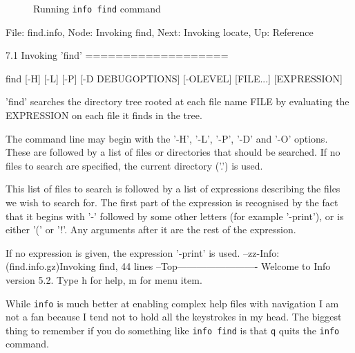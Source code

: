 \documentclass[10pt,american,]{book}
\newenvironment{Shaded}{\begin{snugshade}}{\end{snugshade}}
\newcommand{\KeywordTok}[1]{\textcolor[rgb]{0.13,0.29,0.53}{\textbf{{#1}}}}
\newcommand{\StringTok}[1]{\textcolor[rgb]{0.31,0.60,0.02}{{#1}}}
\newcommand{\NormalTok}[1]{{#1}}
\numberwithin{figure}{chapter}
\DeclareRobustCommand{\drcap}[1]{\begin{figure}[H]\caption{#1}\end{figure}}
\renewcommand{\KeywordTok}[1]{{#1}}
\renewcommand{\StringTok}[1]{{#1}}
\renewcommand{\NormalTok}[1]{{#1}}
\begin{document}
\drcap{Running \texttt{info find} command}

\begin{Shaded}
\begin{Highlighting}[]
\KeywordTok{File}\NormalTok{: find.info,  Node: Invoking find,  Next: Invoking locate,  Up: Reference}

\KeywordTok{7.1} \NormalTok{Invoking }\StringTok{'find'}
\NormalTok{===================}

     \KeywordTok{find} \NormalTok{[-H] [-L] [-P] [-D DEBUGOPTIONS] [-OLEVEL] [FILE...] [EXPRESSION]}

   \StringTok{'find'} \KeywordTok{searches} \NormalTok{the directory tree rooted at each file name FILE by}
\KeywordTok{evaluating} \NormalTok{the EXPRESSION on each file it finds in the tree.}

   \KeywordTok{The} \NormalTok{command line may begin with the }\StringTok{'-H'}\NormalTok{, }\StringTok{'-L'}\NormalTok{, }\StringTok{'-P'}\NormalTok{, }\StringTok{'-D'} \NormalTok{and }\StringTok{'-O'}
\KeywordTok{options.}  \NormalTok{These are followed by a list of files or directories that}
\KeywordTok{should} \NormalTok{be searched.  If no files to search are specified, the current}
\KeywordTok{directory} \NormalTok{(}\StringTok{'.'}\NormalTok{) }\KeywordTok{is} \NormalTok{used.}

   \KeywordTok{This} \NormalTok{list of files to search is followed by a list of expressions}
\KeywordTok{describing} \NormalTok{the files we wish to search for.  The first part of the}
\KeywordTok{expression} \NormalTok{is recognised by the fact that it begins with }\StringTok{'-'} \NormalTok{followed by}
\KeywordTok{some} \NormalTok{other letters (for example }\StringTok{'-print'}\NormalTok{), }\KeywordTok{or} \NormalTok{is either }\StringTok{'('} \NormalTok{or }\StringTok{'!'}\NormalTok{.  Any}
\KeywordTok{arguments} \NormalTok{after it are the rest of the expression.}

   \KeywordTok{If} \NormalTok{no expression is given, the expression }\StringTok{'-print'} \NormalTok{is used.}
\KeywordTok{--zz-Info}\NormalTok{: (find.info.gz)}\KeywordTok{Invoking} \NormalTok{find, 44 lines --Top-------------------------}
\KeywordTok{Welcome} \NormalTok{to Info version 5.2. Type h for help, m for menu item.}
\end{Highlighting}
\end{Shaded}

While \texttt{info} is much better at enabling complex help files with
navigation I am not a fan because I tend not to hold all the keystrokes
in my head. The biggest thing to remember if you do something like
\texttt{info\ find} is that \texttt{q} quits the \texttt{info} command.
\end{document}
